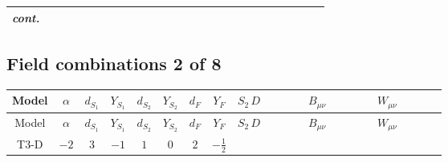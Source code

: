 \documentclass[8pt]{article}
\begin{document}
\begin{landscape}
\begin{longtable}{@{}cccccccc >{\raggedright\arraybackslash}p{0.21\linewidth} >{\raggedright\arraybackslash}p{0.21\linewidth} >{\raggedright\arraybackslash}p{0.21\linewidth}@{}}
\textit{cont.} &  &  &  &  &  &  &  & \scriptsize\adjustbox{max width=\linewidth}{$\begin{gathered} -\frac{2 \hbar  \overline{y_{1,i_1,r_1}} S_{1,j_3} S_{1,j_4} y_{1,i_1,r_1} S_{1,j_1}{}^{\dagger } S_{1,j_2}{}^{\dagger } \mathcal{I}_{S_1,j_3,j_1,j_4,j_2}{}^2 \lambda_{S_1}^{(1)}^{(2)}}{\sqrt{3} \epsilon } \\ -\frac{\hbar  \overline{y_{1,i_1,r_1}} S_{1,j_3} S_{1,j_4} y_{1,i_1,r_1} S_{1,j_1}{}^{\dagger } S_{1,j_2}{}^{\dagger } \mathcal{I}_{S_1,j_3,j_1,j_4,j_2}{}^2 \lambda_{S_1}^{(1)}^{(2)}}{\sqrt{3}}\end{gathered}$} &  &  \\
\midrule
\bottomrule
\end{longtable}
\clearpage
\subsection*{Field combinations 2 of 8}
\begin{longtable}{@{}cccccccc >{\raggedright\arraybackslash}p{0.21\linewidth} >{\raggedright\arraybackslash}p{0.21\linewidth} >{\raggedright\arraybackslash}p{0.21\linewidth}@{}}
\toprule
Model & $\alpha$ & $d_{S_1}$ & $Y_{S_1}$ & $d_{S_2}$ & $Y_{S_2}$ & $d_F$ & $Y_F$ & $S_2\,D$ & $B_{\mu\nu}$ & $W_{\mu\nu}$ \\
\midrule
\endfirsthead
\toprule
Model & $\alpha$ & $d_{S_1}$ & $Y_{S_1}$ & $d_{S_2}$ & $Y_{S_2}$ & $d_F$ & $Y_F$ & $S_2\,D$ & $B_{\mu\nu}$ & $W_{\mu\nu}$ \\
\midrule
\endhead
T3-D & $-2$ & $3$ & $-1$ & $1$ & $0$ & $2$ & $-\frac{1}{2}$ & \scriptsize\adjustbox{max width=\linewidth}{$\begin{gathered} +D_{\mu _1}\left(S_2\right){}^{\dagger } D_{\mu _1}\left(S_2\right)\end{gathered}$} & \scriptsize\adjustbox{max width=\linewidth}{$\begin{gathered} -\frac{\hbar  B_{\mu _1\mu _2}^2}{2 \epsilon }\end{gathered}$} & \scriptsize\adjustbox{max width=\linewidth}{$\begin{gathered} -\frac{\hbar  \left(W_{\mu _1\mu _2}^{A_1}\right){}^2}{2 \epsilon }\end{gathered}$} \\
\midrule
\bottomrule
\end{longtable}
\clearpage

\end{landscape}
\end{document}
